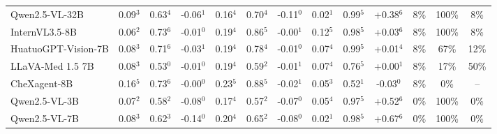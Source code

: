 \documentclass{article}
\begin{document}
\begin{table}[t]
{\begin{tabular}{l@{\hspace{3pt}}ccc@{\hspace{4pt}}ccc@{\hspace{4pt}}ccc@{\hspace{4pt}}ccc}
Qwen2.5-VL-32B & \cellcolor{cfSage2}0.09$^{3}$ & \cellcolor{cfSage2}0.63$^{4}$ & \cellcolor{cfSlate2}-0.06$^{1}$ & \cellcolor{cfSage3}0.16$^{4}$ & \cellcolor{cfSage2}0.70$^{4}$ & \cellcolor{cfSlate3}-0.11$^{0}$ & \cellcolor{cfSage1}0.02$^{1}$ & \cellcolor{cfSage4}0.99$^{5}$ & \cellcolor{cfTerra4}+0.38$^{6}$ & \cellcolor{cfTerra2}8\% & \cellcolor{cfTerra4}100\% & 8\% \\
InternVL3.5-8B & \cellcolor{cfSage2}0.06$^{2}$ & \cellcolor{cfSage2}0.73$^{6}$ & \cellcolor{cfSlate1}-0.01$^{0}$ & \cellcolor{cfSage3}0.19$^{4}$ & \cellcolor{cfSage3}0.86$^{5}$ & \cellcolor{cfSlate1}-0.00$^{1}$ & \cellcolor{cfSage2}0.12$^{5}$ & \cellcolor{cfSage4}0.98$^{5}$ & \cellcolor{cfTerra2}+0.03$^{6}$ & \cellcolor{cfTerra2}8\% & \cellcolor{cfTerra4}100\% & 8\% \\
HuatuoGPT-Vision-7B & \cellcolor{cfSage2}0.08$^{3}$ & \cellcolor{cfSage2}0.71$^{6}$ & \cellcolor{cfSlate2}-0.03$^{1}$ & \cellcolor{cfSage3}0.19$^{4}$ & \cellcolor{cfSage3}0.78$^{4}$ & \cellcolor{cfSlate1}-0.01$^{0}$ & \cellcolor{cfSage2}0.07$^{4}$ & \cellcolor{cfSage4}0.99$^{5}$ & \cellcolor{cfTerra1}+0.01$^{4}$ & \cellcolor{cfTerra2}8\% & \cellcolor{cfTerra3}67\% & 12\% \\
LLaVA-Med 1.5 7B & \cellcolor{cfSage2}0.08$^{3}$ & \cellcolor{cfSage1}0.53$^{0}$ & \cellcolor{cfSlate1}-0.01$^{0}$ & \cellcolor{cfSage3}0.19$^{4}$ & \cellcolor{cfSage1}0.59$^{2}$ & \cellcolor{cfSlate1}-0.01$^{1}$ & \cellcolor{cfSage2}0.07$^{4}$ & \cellcolor{cfSage3}0.76$^{5}$ & \cellcolor{cfTerra1}+0.00$^{1}$ & \cellcolor{cfTerra2}8\% & \cellcolor{cfTerra2}17\% & 50\% \\
CheXagent-8B & \cellcolor{cfSage3}0.16$^{5}$ & \cellcolor{cfSage2}0.73$^{6}$ & \cellcolor{cfSlate1}-0.00$^{0}$ & \cellcolor{cfSage4}0.23$^{5}$ & \cellcolor{cfSage3}0.88$^{5}$ & \cellcolor{cfSlate1}-0.02$^{1}$ & \cellcolor{cfSage2}0.05$^{3}$ & \cellcolor{cfSage1}0.52$^{1}$ & \cellcolor{cfSlate2}-0.03$^{0}$ & \cellcolor{cfTerra2}8\% & \cellcolor{cfTerra1}0\% & -- \\
Qwen2.5-VL-3B & \cellcolor{cfSage2}0.07$^{2}$ & \cellcolor{cfSage1}0.58$^{2}$ & \cellcolor{cfSlate2}-0.08$^{0}$ & \cellcolor{cfSage3}0.17$^{4}$ & \cellcolor{cfSage1}0.57$^{2}$ & \cellcolor{cfSlate2}-0.07$^{0}$ & \cellcolor{cfSage1}0.05$^{4}$ & \cellcolor{cfSage4}0.97$^{5}$ & \cellcolor{cfTerra4}+0.52$^{6}$ & \cellcolor{cfTerra1}0\% & \cellcolor{cfTerra4}100\% & 0\% \\
Qwen2.5-VL-7B & \cellcolor{cfSage2}0.08$^{3}$ & \cellcolor{cfSage2}0.62$^{3}$ & \cellcolor{cfSlate3}-0.14$^{0}$ & \cellcolor{cfSage3}0.20$^{4}$ & \cellcolor{cfSage2}0.65$^{2}$ & \cellcolor{cfSlate2}-0.08$^{0}$ & \cellcolor{cfSage1}0.02$^{1}$ & \cellcolor{cfSage4}0.98$^{5}$ & \cellcolor{cfTerra4}+0.67$^{6}$ & \cellcolor{cfTerra1}0\% & \cellcolor{cfTerra4}100\% & 0\% \\

\end{tabular}}
\end{table}
\end{document}

